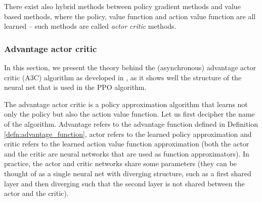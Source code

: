 There exist also hybrid methods between policy gradient methods and value based methods, where the policy, value function and action value function are all learned -- such methods are called \textit{actor critic} methods.

\subsubsection{Advantage actor critic}
In this section, we present the theory behind the (asynchronous) advantage actor critic (A3C) algorithm as developed in \cite{a3c_paper}, as it shows well the structure of the neural net that is used in the PPO algorithm.

The advantage actor critic is a policy approximation algorithm that learns not only the policy but also the action value function. Let us first decipher the name of the algorithm. Advantage refers to the advantage function defined in Definition \ref{defn:advantage_function}, actor refers to the learned policy approximation and critic refers to the learned action value function approximation (both the actor and the critic are neural networks that are used as function approximators). In practice, the actor and critic networks share some parameters (they can be thought of as a single neural net with diverging structure, such as a first shared layer and then diverging such that the second layer is not shared between the actor and the critic).

